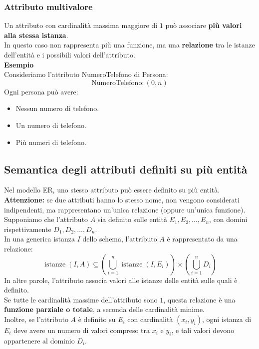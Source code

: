 \subsubsection*{Attributo multivalore}
Un attributo con cardinalità massima maggiore di $1$
può associare \textbf{più valori alla stessa istanza}.\\
In questo caso non rappresenta più una funzione,
ma una \textbf{relazione} tra le istanze dell'entità
e i possibili valori dell'attributo.\\
\textcolor{verdeEsempio}{\textbf{Esempio}}\\
Consideriamo l'attributo NumeroTelefono di Persona:
\[
\text{NumeroTelefono}:(0,n)
\]
Ogni persona può avere:
\begin{itemize}
    \item Nessun numero di telefono.
    \item Un numero di telefono.
    \item Più numeri di telefono.
\end{itemize}


\subsection*{Semantica degli attributi definiti su più entità}

Nel modello ER, uno stesso attributo può essere definito
su più entità.\\
\textbf{Attenzione:} se due attributi hanno lo stesso nome,
non vengono considerati indipendenti, ma rappresentano
un'unica relazione (oppure un'unica funzione).\\
Supponiamo che l'attributo $A$ sia definito sulle entità
$E_1,E_2,\ldots,E_n$, con domini rispettivamente
$D_1,D_2,\ldots,D_n$.\\
In una generica istanza $I$ dello schema, l'attributo
$A$ è rappresentato da una relazione:
\[
\operatorname{istanze}(I,A)
\subseteq
\left(
\bigcup_{i=1}^{n}\operatorname{istanze}(I,E_i)
\right)
\times
\left(
\bigcup_{i=1}^{n}D_i
\right)
\]
In altre parole, l'attributo associa valori alle istanze
delle entità sulle quali è definito.\\
Se tutte le cardinalità massime dell'attributo sono $1$,
questa relazione è una \textbf{funzione parziale o totale},
a seconda delle cardinalità minime.\\
Inoltre, se l'attributo $A$ è definito su $E_i$ con
cardinalità $(x_i,y_i)$, ogni istanza di $E_i$ deve avere
un numero di valori compreso tra $x_i$ e $y_i$,
e tali valori devono appartenere al dominio $D_i$.


